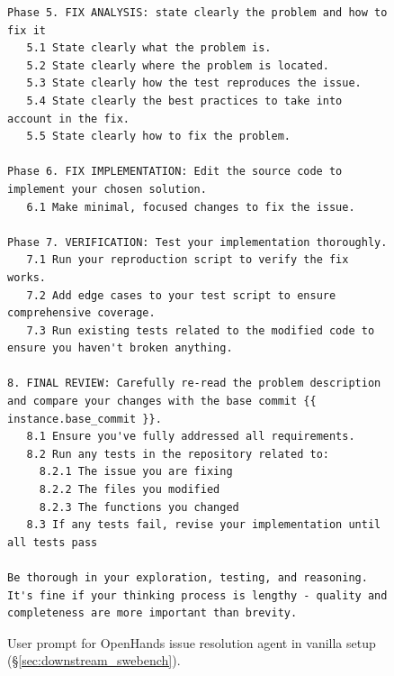 \begin{figure}[!h]
\begin{tcolorbox}[colback=purple!6!white, colframe=purple!75!black, title={\small User Prompt for OpenHands Issue Resolution Agent (Vanilla Setting)}]
\begin{lstlisting}[basicstyle=\fontsize{7.7}{8}\ttfamily]
Phase 5. FIX ANALYSIS: state clearly the problem and how to fix it
   5.1 State clearly what the problem is.
   5.2 State clearly where the problem is located.
   5.3 State clearly how the test reproduces the issue.
   5.4 State clearly the best practices to take into account in the fix.
   5.5 State clearly how to fix the problem.

Phase 6. FIX IMPLEMENTATION: Edit the source code to implement your chosen solution.
   6.1 Make minimal, focused changes to fix the issue.

Phase 7. VERIFICATION: Test your implementation thoroughly.
   7.1 Run your reproduction script to verify the fix works.
   7.2 Add edge cases to your test script to ensure comprehensive coverage.
   7.3 Run existing tests related to the modified code to ensure you haven't broken anything.

8. FINAL REVIEW: Carefully re-read the problem description and compare your changes with the base commit {{ instance.base_commit }}.
   8.1 Ensure you've fully addressed all requirements.
   8.2 Run any tests in the repository related to:
     8.2.1 The issue you are fixing
     8.2.2 The files you modified
     8.2.3 The functions you changed
   8.3 If any tests fail, revise your implementation until all tests pass

Be thorough in your exploration, testing, and reasoning. It's fine if your thinking process is lengthy - quality and completeness are more important than brevity.

\end{lstlisting}
\end{tcolorbox}
\caption{User prompt for OpenHands issue resolution agent in vanilla setup (\S\ref{sec:downstream_swebench}).}
\label{fig:user_prompt_vanilla}
\end{figure}

